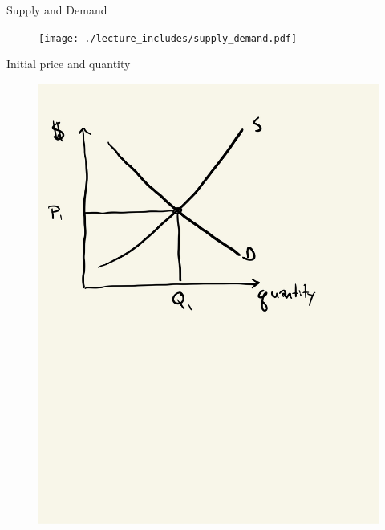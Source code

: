 \documentclass{beamer}
\begin{document}
\begin{frame}{Supply and Demand}
	
	\begin{figure}
	\texttt{[image: ./lecture\_includes/supply\_demand.pdf]}
	\end{figure}
\end{frame}


\begin{frame}{Initial price and quantity}

	\begin{figure}
	\includegraphics[scale=0.15]{./lecture_includes/elasticity_1.jpg}
	\end{figure}
\end{frame}
\end{document}
